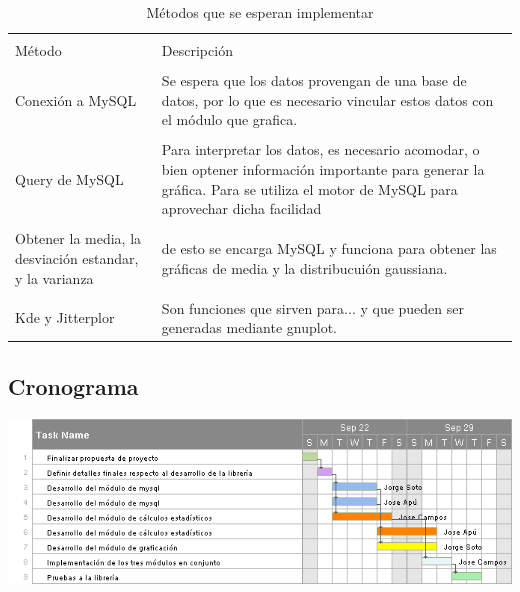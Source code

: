 \documentclass[11pt]{article}
\begin{document}
\begin{table}[ht]
\caption{Métodos que se esperan implementar} %
\centering %
\begin{tabular}{p{4cm} p{12cm}} %
\hline\hline %
\\
Método & Descripción \\ [0.5ex] %
\hline %
\\

Conexión a MySQL & Se espera que los datos provengan de una base de datos, por lo que es necesario vincular estos datos con el módulo que grafica. \\ %

\\

Query de MySQL & Para interpretar los datos, es necesario acomodar, o bien optener información importante para generar la gráfica. Para se utiliza el motor de MySQL para aprovechar dicha facilidad \\

\\

Obtener la media, la desviación estandar, y la varianza & de esto se encarga MySQL y funciona para obtener las gráficas de media y la distribucuión gaussiana. \\

\\

Kde y Jitterplor & Son funciones que sirven para... y que pueden ser generadas mediante gnuplot. \\
\hline %
\end{tabular}
\label{table:nonlin} %
\end{table}

\subsection*{Cronograma}

\includegraphics[scale=0.7]{ganttChart}
\end{document}
